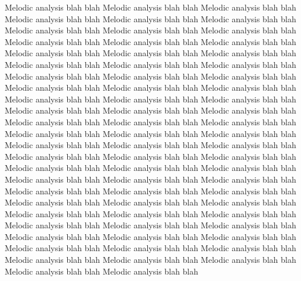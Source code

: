 Melodic analysis blah blah Melodic analysis blah blah Melodic analysis blah blah Melodic analysis blah blah Melodic analysis blah blah Melodic analysis blah blah Melodic analysis blah blah Melodic analysis blah blah Melodic analysis blah blah Melodic analysis blah blah Melodic analysis blah blah Melodic analysis blah blah Melodic analysis blah blah Melodic analysis blah blah Melodic analysis blah blah Melodic analysis blah blah Melodic analysis blah blah Melodic analysis blah blah Melodic analysis blah blah Melodic analysis blah blah Melodic analysis blah blah Melodic analysis blah blah Melodic analysis blah blah Melodic analysis blah blah Melodic analysis blah blah Melodic analysis blah blah Melodic analysis blah blah Melodic analysis blah blah Melodic analysis blah blah Melodic analysis blah blah Melodic analysis blah blah Melodic analysis blah blah Melodic analysis blah blah Melodic analysis blah blah Melodic analysis blah blah Melodic analysis blah blah Melodic analysis blah blah Melodic analysis blah blah Melodic analysis blah blah Melodic analysis blah blah Melodic analysis blah blah Melodic analysis blah blah Melodic analysis blah blah Melodic analysis blah blah Melodic analysis blah blah Melodic analysis blah blah Melodic analysis blah blah Melodic analysis blah blah Melodic analysis blah blah Melodic analysis blah blah Melodic analysis blah blah Melodic analysis blah blah Melodic analysis blah blah Melodic analysis blah blah Melodic analysis blah blah Melodic analysis blah blah Melodic analysis blah blah Melodic analysis blah blah Melodic analysis blah blah Melodic analysis blah blah Melodic analysis blah blah Melodic analysis blah blah Melodic analysis blah blah Melodic analysis blah blah Melodic analysis blah blah Melodic analysis blah blah Melodic analysis blah blah Melodic analysis blah blah Melodic analysis blah blah Melodic analysis blah blah Melodic analysis blah blah 